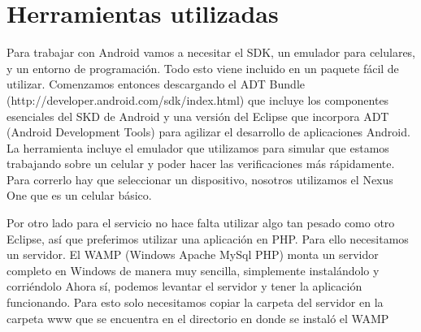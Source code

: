 \section{Herramientas utilizadas}

Para trabajar con Android vamos a necesitar el SDK, un emulador para celulares, y un entorno de programación. Todo esto viene incluido en un paquete fácil de utilizar.
Comenzamos entonces descargando el ADT Bundle (http://developer.android.com/sdk/index.html) que incluye los componentes esenciales del SKD de Android y una versión del Eclipse que incorpora ADT (Android Development Tools) para agilizar el desarrollo de aplicaciones Android. La herramienta incluye el emulador que utilizamos para simular que estamos trabajando sobre un celular y poder hacer las verificaciones más rápidamente. Para correrlo hay que seleccionar un dispositivo, nosotros utilizamos el Nexus One que es un celular básico.


Por otro lado para el servicio no hace falta utilizar algo tan pesado como otro Eclipse, así que preferimos utilizar una aplicación en PHP. Para ello necesitamos un servidor.
El WAMP (Windows Apache MySql PHP) monta un servidor completo en Windows de manera muy sencilla, simplemente instalándolo y corriéndolo
Ahora sí, podemos levantar el servidor y tener la aplicación funcionando. Para esto solo necesitamos copiar la carpeta del servidor en la carpeta www que se encuentra en el directorio en donde se instaló el WAMP
